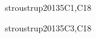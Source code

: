 \begin{syllabus}
\begin{unit}{\SDFFundamentalProgrammingConcepts}{}{stroustrup2013}{5}{C1,C18}
\begin{topics}
	\item \SDFFundamentalProgrammingConceptsTopicBasic
	\item \SDFFundamentalProgrammingConceptsTopicVariables
	\item \SDFFundamentalProgrammingConceptsTopicExpressions
	\item \SDFFundamentalProgrammingConceptsTopicSimple
	\item \SDFFundamentalProgrammingConceptsTopicConditional
	\item \SDFFundamentalProgrammingConceptsTopicFunctions
	\item \SDFFundamentalProgrammingConceptsTopicThe
\end{topics}

\begin{learningoutcomes}
	\item \SDFFundamentalProgrammingConceptsLOAnalyzeAndBehavior [\Usage]
	\item \SDFFundamentalProgrammingConceptsLOIdentifyAndOf [\Usage]
	\item \SDFFundamentalProgrammingConceptsLOWritePrograms [\Usage]
	\item \SDFFundamentalProgrammingConceptsLOModify [\Usage]
	\item \SDFFundamentalProgrammingConceptsLODesignImplement [\Usage]
	\item \SDFFundamentalProgrammingConceptsLOWriteAUses [\Usage]
	\item \SDFFundamentalProgrammingConceptsLOChooseAppropriateIteration [\Usage]
	\item \SDFFundamentalProgrammingConceptsLODescribeTheRecursion [\Usage]
	\item \SDFFundamentalProgrammingConceptsLOIdentifyTheAndCase [\Usage]
\end{learningoutcomes}
\end{unit}

\begin{unit}{\SDFAlgorithmsandDesign}{}{stroustrup2013}{5}{C3,C18}
\begin{topics}
	\item \SDFAlgorithmsandDesignTopicThe
	\item \SDFAlgorithmsandDesignTopicTheRole
	\item \SDFAlgorithmsandDesignTopicProblem
	\item \SDFAlgorithmsandDesignTopicFundamental
\end{topics}


\end{unit}
\end{syllabus}
